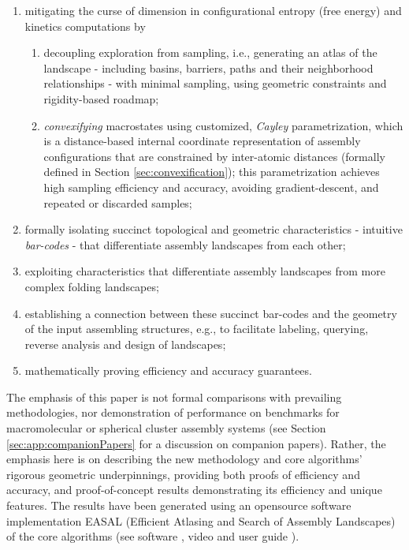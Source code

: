 \documentclass[]{article}
\begin{document}
\begin{enumerate}
\item mitigating the curse of dimension in configurational entropy (free
energy) and kinetics computations by
    \begin{enumerate}
      \item decoupling exploration from sampling, i.e., generating 
	   an atlas of the landscape - including basins, barriers, paths 
		and their neighborhood relationships - with minimal sampling, using
		geometric constraints \cite{SJS:Handbook} and rigidity-based 
		roadmap;
      \item \emph{convexifying} macrostates using customized, 
      \emph{Cayley} parametrization\cite{SiGa:2010}, 
	  which is a distance-based internal coordinate representation of
	  assembly configurations that are constrained by inter-atomic distances (formally
	  defined in Section \ref{sec:convexification}); this
      parametrization achieves high sampling efficiency and accuracy, avoiding
      gradient-descent, and repeated or discarded samples; 
    \end{enumerate}
\item formally isolating succinct topological and geometric characteristics 
- intuitive \emph{bar-codes} - that differentiate assembly landscapes
from each other; 
\item exploiting characteristics that differentiate 
assembly landscapes from more complex folding landscapes;
\item establishing a connection between these succinct bar-codes
and the geometry of the input assembling structures, e.g., to facilitate 
labeling, querying, reverse analysis and design of landscapes;
\item mathematically proving efficiency and accuracy guarantees.
\end{enumerate}

The emphasis of this paper is not formal comparisons with prevailing
methodologies, nor demonstration of performance on benchmarks
\cite{Chill2014,cha2015accelerated} for macromolecular or spherical cluster
assembly systems (see Section \ref{sec:app:companionPapers} for a discussion on
companion papers). Rather, the emphasis here is on describing the new
methodology and core algorithms' rigorous geometric underpinnings, providing
both proofs of efficiency and accuracy, and proof-of-concept results
demonstrating its efficiency and unique features. The results have been
generated using an opensource software implementation EASAL (Efficient Atlasing
and Search of Assembly Landscapes) of the core algorithms (see software
\cite{easalSoftware}, video \cite{easalVideo} and user guide
\cite{easalUserGuide}).
\end{document}
